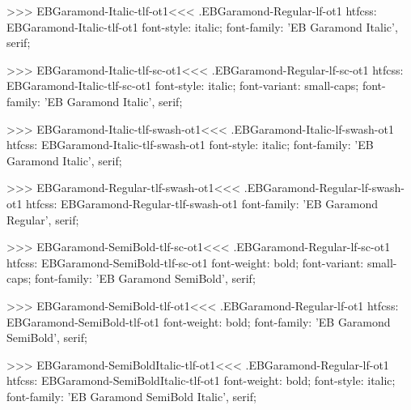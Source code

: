 {{{{{{{>>>
\<EBGaramond-Italic-tlf-ot1\><<<
.EBGaramond-Regular-lf-ot1
htfcss:  EBGaramond-Italic-tlf-ot1  font-style: italic; font-family: 'EB Garamond Italic', serif;

>>>
\<EBGaramond-Italic-tlf-sc-ot1\><<<
.EBGaramond-Regular-lf-sc-ot1
htfcss:  EBGaramond-Italic-tlf-sc-ot1  font-style: italic; font-variant: small-caps; font-family: 'EB Garamond Italic', serif;

>>>
\<EBGaramond-Italic-tlf-swash-ot1\><<<
.EBGaramond-Italic-lf-swash-ot1
htfcss:  EBGaramond-Italic-tlf-swash-ot1  font-style: italic; font-family: 'EB Garamond Italic', serif;

>>>
\<EBGaramond-Regular-tlf-swash-ot1\><<<
.EBGaramond-Regular-lf-swash-ot1
htfcss:  EBGaramond-Regular-tlf-swash-ot1  font-family: 'EB Garamond Regular', serif;

>>>
\<EBGaramond-SemiBold-tlf-sc-ot1\><<<
.EBGaramond-Regular-lf-sc-ot1
htfcss:  EBGaramond-SemiBold-tlf-sc-ot1  font-weight: bold; font-variant: small-caps; font-family: 'EB Garamond SemiBold', serif;

>>>
\<EBGaramond-SemiBold-tlf-ot1\><<<
.EBGaramond-Regular-lf-ot1
htfcss:  EBGaramond-SemiBold-tlf-ot1  font-weight: bold; font-family: 'EB Garamond SemiBold', serif;

>>>
\<EBGaramond-SemiBoldItalic-tlf-ot1\><<<
.EBGaramond-Regular-lf-ot1
htfcss:  EBGaramond-SemiBoldItalic-tlf-ot1  font-weight: bold; font-style: italic; font-family: 'EB Garamond SemiBold Italic', serif;

}}}}}}}
